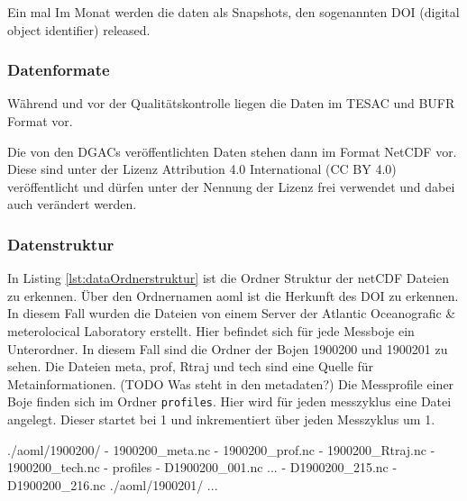     Ein mal Im Monat werden die daten als Snapshots, den sogenannten DOI (digital object identifier) released. 
    
\subsubsection{Datenformate}
    
    Während und vor der Qualitätskontrolle liegen die Daten im TESAC und BUFR Format vor. 
    
    Die von den DGACs veröffentlichten Daten stehen dann im Format NetCDF vor. Diese sind unter der Lizenz Attribution 4.0 International (CC BY 4.0) veröffentlicht und dürfen unter der Nennung der Lizenz frei verwendet und dabei auch verändert werden.
    
    \cite{ArgoDataDocumentation}
    
\subsubsection{Datenstruktur}

In Listing \ref{lst:dataOrdnerstruktur} ist die Ordner Struktur der netCDF Dateien zu erkennen. Über den Ordnernamen aoml ist die Herkunft des DOI zu erkennen. In diesem Fall wurden die Dateien von einem Server der  Atlantic Oceanografic \& meterolocical Laboratory erstellt. Hier befindet sich für jede Messboje ein Unterordner. In diesem Fall sind die Ordner der Bojen 1900200 und 1900201 zu sehen. Die Dateien meta, prof, Rtraj und tech sind eine Quelle für Metainformationen. (TODO Was steht in den metadaten?) Die Messprofile einer Boje finden sich im Ordner \texttt{profiles}. Hier wird für jeden messzyklus eine Datei angelegt. Dieser startet bei 1 und inkrementiert über jeden Messzyklus um 1.
    
    \begin{python}[label={lst:dataOrdnerstruktur}, caption={test}]
./aoml/1900200/
- 1900200_meta.nc
- 1900200_prof.nc
- 1900200_Rtraj.nc
- 1900200_tech.nc
- profiles
    - D1900200_001.nc
    ...
    - D1900200_215.nc
    - D1900200_216.nc
./aoml/1900201/
...\end{python}

    
